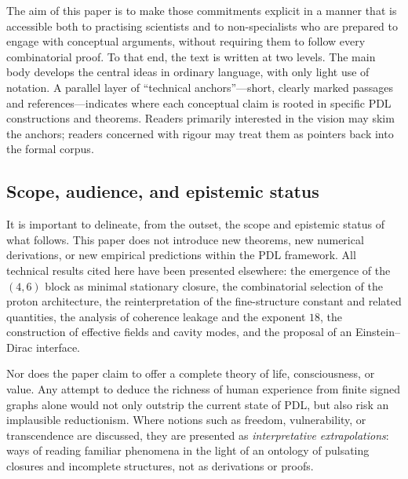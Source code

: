 \documentclass[11pt,a4paper]{article}
\theoremstyle{definition}
\begin{document}
The aim of this paper is to make those commitments explicit in a manner that is accessible both to practising scientists and to non-specialists who are prepared to engage with conceptual arguments, without requiring them to follow every combinatorial proof. To that end, the text is written at two levels. The main body develops the central ideas in ordinary language, with only light use of notation. A parallel layer of ``technical anchors''---short, clearly marked passages and references---indicates where each conceptual claim is rooted in specific PDL constructions and theorems. Readers primarily interested in the vision may skim the anchors; readers concerned with rigour may treat them as pointers back into the formal corpus.

\subsection{Scope, audience, and epistemic status}

It is important to delineate, from the outset, the scope and epistemic status of what follows. This paper does not introduce new theorems, new numerical derivations, or new empirical predictions within the PDL framework. All technical results cited here have been presented elsewhere: the emergence of the $(4,6)$ block as minimal stationary closure, the combinatorial selection of the proton architecture, the reinterpretation of the fine-structure constant and related quantities, the analysis of coherence leakage and the exponent $18$, the construction of effective fields and cavity modes, and the proposal of an Einstein--Dirac interface.\cite{Laubscher_MinimalClosures_46_2024,Laubscher_ProtonArch_v2_2024,Laubscher_Alpha_v2_2024,Laubscher_Exponent18_v2_2024,Laubscher_EffectiveFields_2024,Laubscher_CavityModes_PDL_2024,Laubscher_Einstein_Dirac_2024}

Nor does the paper claim to offer a complete theory of life, consciousness, or value. Any attempt to deduce the richness of human experience from finite signed graphs alone would not only outstrip the current state of PDL, but also risk an implausible reductionism. Where notions such as freedom, vulnerability, or transcendence are discussed, they are presented as \emph{interpretative extrapolations}: ways of reading familiar phenomena in the light of an ontology of pulsating closures and incomplete structures, not as derivations or proofs.\cite{Laubscher_Existence_PulsatingClosure_2026,Laubscher_PDL_TO_Dialogue_2024}
\end{document}
